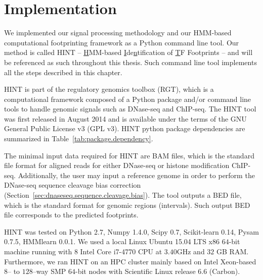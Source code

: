 \section{Implementation}
\label{sec:implementation}

We implemented our signal processing methodology and our HMM-based computational footprinting framework as a Python command line tool. Our method is called HINT -- \underline{H}MM-based \underline{I}de\underline{n}tification of \underline{T}F Footprints -- and will be referenced as such throughout this thesis. Such command line tool implements all the steps described in this chapter.

HINT is part of the regulatory genomics toolbox (RGT), which is a computational framework composed of a Python package and/or command line tools to handle genomic signals such as DNase-seq and ChIP-seq. The HINT tool was first released in August 2014 and is available under the terms of the GNU General Public License v3 (GPL v3). HINT python package dependencies are summarized in Table~\ref{tab:package.dependency}.

The minimal input data required for HINT are BAM files, which is the standard file format for aligned reads for either DNase-seq or histone modification ChIP-seq. Additionally, the user may input a reference genome in order to perform the DNase-seq sequence cleavage bias correction (Section~\ref{sec:dnaseseq.sequence.cleavage.bias}). The tool outputs a BED file, which is the standard format for genomic regions (intervals). Such output BED file corresponds to the predicted footprints.

HINT was tested on Python 2.7, Numpy 1.4.0, Scipy 0.7, Scikit-learn 0.14, Pysam 0.7.5, HMMlearn 0.0.1. We used a local Linux Ubuntu 15.04 LTS x86 $64$-bit machine running with $8$ Intel Core i7-4770 CPU at $3.40$GHz and $32$ GB RAM. Furthermore, we ran HINT on an HPC cluster mainly based on Intel Xeon-based $8$-- to $128$--way SMP $64$-bit nodes with Scientific Linux release 6.6 (Carbon).

